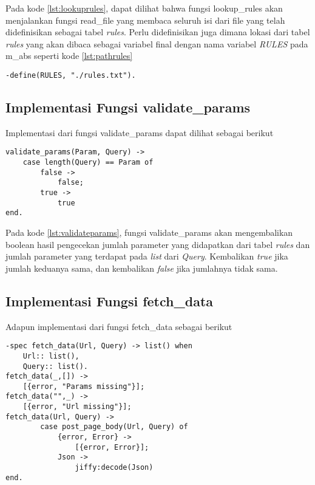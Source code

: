 Pada kode \ref{lst:lookuprules}, dapat dilihat bahwa fungsi lookup\_rules akan menjalankan fungsi read\_file yang membaca seluruh isi dari file yang telah didefinisikan sebagai tabel \textit{rules}. Perlu didefinisikan juga dimana lokasi dari tabel \textit{rules} yang akan dibaca sebagai variabel final dengan nama variabel \textit{RULES} pada m\_abs seperti kode \ref{lst:pathrules}
\begin{minipage}{\linewidth}
\begin{lstlisting}[caption={lokasi dari \textit{file} rules.txt},label={lst:pathrules}]
-define(RULES, "./rules.txt").
\end{lstlisting}
\end{minipage}

\subsection{Implementasi Fungsi validate\_params}

Implementasi dari fungsi validate\_params dapat dilihat sebagai berikut
\begin{minipage}{\linewidth}
\begin{lstlisting}[caption={Implementasi fungsi validate\_params},label={lst:validateparams}]
validate_params(Param, Query) ->
	case length(Query) == Param of
		false ->
			false;
		true ->
			true
end.
\end{lstlisting}
\end{minipage}

Pada kode \ref{lst:validateparams}, fungsi validate\_params akan mengembalikan boolean hasil pengecekan jumlah parameter yang didapatkan dari tabel \textit{rules} dan jumlah parameter yang terdapat pada \textit{list} dari \textit{Query}. Kembalikan \textit{true} jika jumlah keduanya sama, dan kembalikan \textit{false} jika jumlahnya tidak sama.

\subsection{Implementasi Fungsi fetch\_data}

Adapun implementasi dari fungsi fetch\_data sebagai berikut

\begin{minipage}{\linewidth}
\begin{lstlisting}[caption={Implementasi fungsi fetch\_data},label={lst:fetchdata}]
-spec fetch_data(Url, Query) -> list() when
	Url:: list(),
    Query:: list().
fetch_data(_,[]) ->
    [{error, "Params missing"}];
fetch_data("",_) ->
	[{error, "Url missing"}];
fetch_data(Url, Query) ->
	    case post_page_body(Url, Query) of
	        {error, Error} ->
	            [{error, Error}];
	        Json ->     
	            jiffy:decode(Json)
end.
\end{lstlisting}
\end{minipage}

